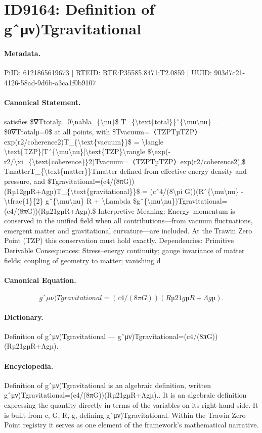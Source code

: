 \section*{ID9164: Definition of gˆμν)Tgravitational}
\paragraph{Metadata.}
PiID: 6121865619673 | RTEID: RTE:P35585.8471:T2.0859 | UUID: 903d7c21-4126-58ad-9d6b-a3ca1f0b9107

\paragraph{Canonical Statement.}
satisfies \$∇Ttotalµ=0\textbackslash{}nabla\_\{\textbackslash{}nu\}\$ T\_\{\textbackslash{}text\{total\}\}ˆ\{\textbackslash{}mu\textbackslash{}nu\} = \$0∇Ttotalµ=0\$ at all points, with \$Tvacuum=〈TZPTµTZP〉exp(r2/coherence2)T\_\{\textbackslash{}text\{vacuum\}\}\$ = \textbackslash{}langle \textbackslash{}text\{TZP\}|Tˆ\{\textbackslash{}mu\textbackslash{}nu\}|\textbackslash{}text\{TZP\}\textbackslash{}rangle \$\textbackslash{}exp(-r2/\textbackslash{}xi\_\{\textbackslash{}text\{coherence\}\}2)Tvacuum=〈TZPTµTZP〉exp(r2/coherence2),\$ TmatterT\_\{\textbackslash{}text\{matter\}\}Tmatter defined from effective energy density and pressure, and \$Tgravitational=(c4/(8πG))(Rµ12gµR+Λgµ)T\_\{\textbackslash{}text\{gravitational\}\}\$ = (cˆ4/(8\textbackslash{}pi G))(Rˆ\{\textbackslash{}mu\textbackslash{}nu\} -\textbackslash{}tfrac\{1\}\{2\} gˆ\{\textbackslash{}mu\textbackslash{}nu\} R + \textbackslash{}Lambda \$gˆ\{\textbackslash{}mu\textbackslash{}nu\})Tgravitational=(c4/(8πG))(Rµ21gµR+Λgµ).\$ Interpretive Meaning: Energy–momentum is conserved in the unified field when all contributions—from vacuum fluctuations, emergent matter and gravitational curvature—are included. At the Trawin Zero Point (TZP) this conservation must hold exactly. Dependencies: Primitive Derivable Consequences: Stress–energy continuity; gauge invariance of matter fields; coupling of geometry to matter; vanishing d

\paragraph{Canonical Equation.}
\[
gˆ{\mu\nu})Tgravitational=(c4/(8πG))(Rµ21gµR+Λgµ).
\]

\paragraph{Dictionary.}
Definition of gˆμν)Tgravitational — gˆμν)Tgravitational=(c4/(8πG))(Rµ21gµR+Λgµ).

\paragraph{Encyclopedia.}
Definition of gˆμν)Tgravitational is an algebraic definition, written gˆμν)Tgravitational=(c4/(8πG))(Rµ21gµR+Λgµ).. It is an algebraic definition expressing the quantity directly in terms of the variables on its right-hand side. It is built from c, G, R, g, defining gˆμν)Tgravitational. Within the Trawin Zero Point registry it serves as one element of the framework's mathematical narrative.
